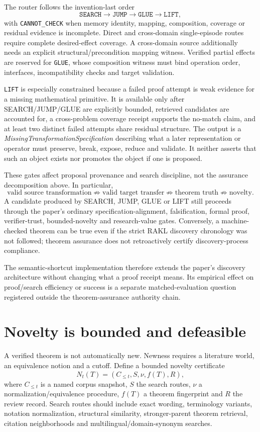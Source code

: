 \documentclass[11pt]{article}
\begin{document}
The router follows the invention-last order
\[
\texttt{SEARCH}\rightarrow\texttt{JUMP}\rightarrow\texttt{GLUE}\rightarrow\texttt{LIFT},
\]
with \texttt{CANNOT\_CHECK} when memory identity, mapping, composition, coverage or residual evidence is incomplete. Direct and cross-domain single-episode routes require complete desired-effect coverage. A cross-domain source additionally needs an explicit structural/precondition mapping witness. Verified partial effects are reserved for \texttt{GLUE}, whose composition witness must bind operation order, interfaces, incompatibility checks and target validation.

\texttt{LIFT} is especially constrained because a failed proof attempt is weak evidence for a missing mathematical primitive. It is available only after SEARCH/JUMP/GLUE are explicitly bounded, retrieved candidates are accounted for, a cross-problem coverage receipt supports the no-match claim, and at least two distinct failed attempts share residual structure. The output is a \emph{MissingTransformationSpecification} describing what a later representation or operator must preserve, break, expose, reduce and validate. It neither asserts that such an object exists nor promotes the object if one is proposed.

These gates affect proposal provenance and search discipline, not the assurance decomposition above. In particular,
\[
\text{valid source transformation}
\not\Rightarrow
\text{valid target transfer}
\not\Rightarrow
\text{theorem truth}
\not\Rightarrow
\text{novelty}.
\]
A candidate produced by SEARCH, JUMP, GLUE or LIFT still proceeds through the paper's ordinary specification-alignment, falsification, formal proof, verifier-trust, bounded-novelty and research-value gates. Conversely, a machine-checked theorem can be true even if the strict RAKL discovery chronology was not followed; theorem assurance does not retroactively certify discovery-process compliance.

The semantic-shortcut implementation therefore extends the paper's discovery architecture without changing what a proof receipt means. Its empirical effect on proof/search efficiency or success is a separate matched-evaluation question registered outside the theorem-assurance authority chain.

\section{Novelty is bounded and defeasible}

A verified theorem is not automatically new. Newness requires a literature world, an equivalence notion and a cutoff. Define a bounded novelty certificate
\[
N_t(T)=(C_{\le t},S,\nu,f(T),R),
\]
where $C_{\le t}$ is a named corpus snapshot, $S$ the search routes, $\nu$ a normalization/equivalence procedure, $f(T)$ a theorem fingerprint and $R$ the review record. Search routes should include exact wording, terminology variants, notation normalization, structural similarity, stronger-parent theorem retrieval, citation neighborhoods and multilingual/domain-synonym searches.
\end{document}

